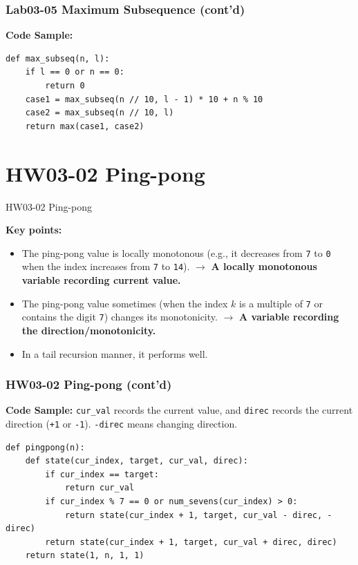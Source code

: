 \documentclass[aspectratio=169]{beamer}
\begin{document}
\begin{frame}[fragile]
\frametitle{{Lab03-05 Maximum Subsequence (cont'd)}}

\textbf{Code Sample:}
\begin{verbatim}
def max_subseq(n, l):
    if l == 0 or n == 0:
        return 0
    case1 = max_subseq(n // 10, l - 1) * 10 + n % 10
    case2 = max_subseq(n // 10, l)
    return max(case1, case2)
\end{verbatim}
    
\end{frame}

\section{HW03-02 Ping-pong}
\begin{frame}{HW03-02 Ping-pong}

    \textbf{Key points:}
    
    \begin{itemize}
        \item The ping-pong value is locally monotonous (e.g., it decreases from \texttt{7} to \texttt{0} when the index increases from \texttt{7} to \texttt{14}). $\to$ \textbf{A locally monotonous variable recording current value.}
        \item The ping-pong value sometimes (when the index $k$ is a multiple of \texttt{7} or contains the digit \texttt{7}) changes its monotonicity. $\to$ \textbf{A variable recording the direction/monotonicity.}
        \item In a tail recursion manner, it performs well.
    \end{itemize}
    
\end{frame}

\begin{frame}[fragile]
\frametitle{{HW03-02 Ping-pong (cont'd)}}

\textbf{Code Sample:} \texttt{cur\_val} records the current value, and \texttt{direc} records the current direction (\texttt{+1} or \texttt{-1}). \texttt{-direc} means changing direction.
\begin{verbatim}
def pingpong(n):
    def state(cur_index, target, cur_val, direc):
        if cur_index == target:
            return cur_val
        if cur_index % 7 == 0 or num_sevens(cur_index) > 0:
            return state(cur_index + 1, target, cur_val - direc, -direc)
        return state(cur_index + 1, target, cur_val + direc, direc)
    return state(1, n, 1, 1)
\end{verbatim}

\end{frame}
\end{document}
